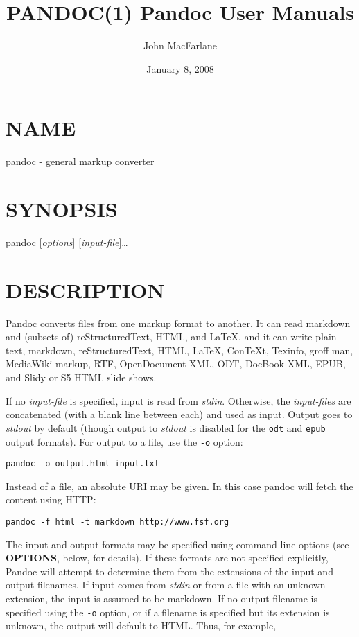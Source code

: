 \documentclass[
  12pt,
  a4paper,
]{article}
\title{PANDOC(1) Pandoc User Manuals}
\author{John MacFarlane}
\date{January 8, 2008}
\begin{document}
\maketitle

\hypertarget{name}{%
\section{NAME}\label{name}}

pandoc - general markup converter

\hypertarget{synopsis}{%
\section{SYNOPSIS}\label{synopsis}}

pandoc {[}\emph{options}{]} {[}\emph{input-file}{]}\ldots{}

\hypertarget{description}{%
\section{DESCRIPTION}\label{description}}

Pandoc converts files from one markup format to another. It can read markdown
and (subsets of) reStructuredText, HTML, and LaTeX, and it can write plain
text, markdown, reStructuredText, HTML, LaTeX, ConTeXt, Texinfo, groff man,
MediaWiki markup, RTF, OpenDocument XML, ODT, DocBook XML, EPUB, and Slidy or
S5 HTML slide shows.

If no \emph{input-file} is specified, input is read from \emph{stdin}.
Otherwise, the \emph{input-files} are concatenated (with a blank line between
each) and used as input. Output goes to \emph{stdout} by default (though
output to \emph{stdout} is disabled for the \texttt{odt} and \texttt{epub}
output formats). For output to a file, use the \texttt{-o} option:

\begin{verbatim}
pandoc -o output.html input.txt
\end{verbatim}

Instead of a file, an absolute URI may be given. In this case pandoc will
fetch the content using HTTP:

\begin{verbatim}
pandoc -f html -t markdown http://www.fsf.org
\end{verbatim}

The input and output formats may be specified using command-line options (see
\textbf{OPTIONS}, below, for details). If these formats are not specified
explicitly, Pandoc will attempt to determine them from the extensions of the
input and output filenames. If input comes from \emph{stdin} or from a file
with an unknown extension, the input is assumed to be markdown. If no output
filename is specified using the \texttt{-o} option, or if a filename is
specified but its extension is unknown, the output will default to HTML. Thus,
for example,
\end{document}
